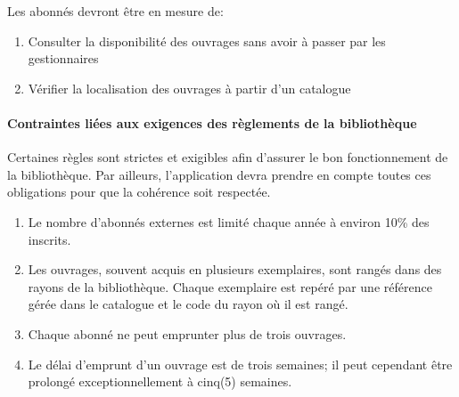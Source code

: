 \par 
    Les abonnés devront être en mesure de: \par 
\begin{enumerate}
    \item Consulter la disponibilité des ouvrages sans avoir à
     passer par les gestionnaires
    \item Vérifier la localisation des ouvrages à partir d’un catalogue
\end{enumerate}
    
\paragraph{Contraintes liées aux exigences des règlements de la bibliothèque}
Certaines règles sont strictes et exigibles afin d’assurer le bon fonctionnement 
de la bibliothèque. Par ailleurs, l’application devra prendre en compte toutes
 ces obligations pour que la cohérence soit respectée. \par
 \begin{enumerate}
     \item Le nombre d’abonnés externes est limité chaque année à environ 
     10\% des inscrits.
     \item Les ouvrages, souvent acquis en plusieurs exemplaires, sont 
     rangés dans des rayons de la bibliothèque. Chaque exemplaire est repéré 
     par une référence gérée dans le catalogue et le code du rayon où il est rangé.
     \item Chaque abonné ne peut emprunter plus de trois ouvrages.
     \item Le délai d’emprunt d’un ouvrage est de trois semaines; il peut 
     cependant être prolongé exceptionnellement à cinq(5) semaines.
 \end{enumerate}